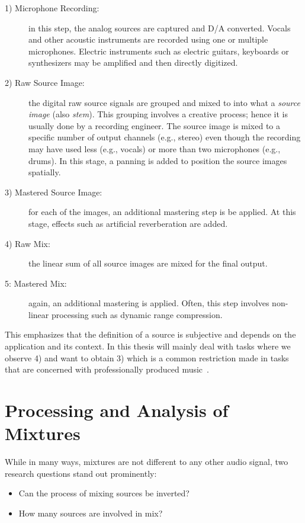 \begin{description}
  \item[1) Microphone Recording:] in this step, the analog sources are captured and D/A converted. 
  Vocals and other acoustic instruments are recorded using one or multiple microphones.
  Electric instruments such as electric guitars, keyboards or synthesizers may be amplified and then directly digitized.
  \item[2) Raw Source Image:] the digital raw source signals are grouped and mixed to into what a \emph{source image} (also \emph{stem}).
  This grouping involves a creative process; hence it is usually done by a recording engineer.
  The source image is mixed to a specific number of output channels (e.g., stereo) even though the recording may have used less (e.g., vocals) or more than two microphones (e.g., drums).
  In this stage, a panning is added to position the source images spatially.
  \item[3) Mastered Source Image:] for each of the images, an additional mastering step is be applied.
  At this stage, effects such as artificial reverberation are added.
  \item[4) Raw Mix:] the linear sum of all source images are mixed for the final output.
  \item[5: Mastered Mix:] again, an additional mastering is applied.
  Often, this step involves non-linear processing such as dynamic range compression.
\end{description}

This emphasizes that the definition of a source is subjective and depends on the application and its context. In this thesis will mainly deal with tasks where we observe 4) and want to obtain 3) which is a common restriction made in tasks that are concerned with professionally produced music~\cite{sisec16}.

\hypertarget{processing-and-analysis-of-mixtures}{%
\section{Processing and Analysis of Mixtures}\label{sec:processing-and-analysis-of-mixtures}}

While in many ways, mixtures are not different to any other audio signal, two research questions stand out prominently:

\begin{itemize}
    \item Can the process of mixing sources be inverted? 
    \item How many sources are involved in mix?
\end{itemize}

